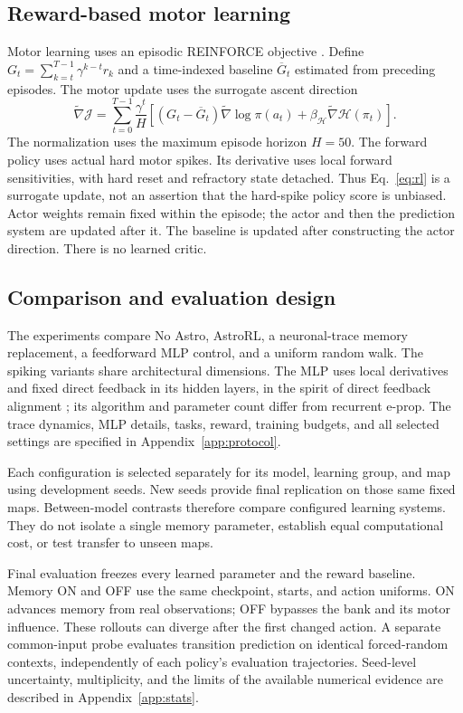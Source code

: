 \subsection{Reward-based motor learning}
Motor learning uses an episodic REINFORCE objective \cite{williams1992}. Define $G_t=\sum_{k=t}^{T-1}\gamma^{k-t}r_k$ and a time-indexed baseline $\overline G_t$ estimated from preceding episodes. The motor update uses the surrogate ascent direction
\begin{equation}
 \widetilde\nabla\mathcal J=
 \sum_{t=0}^{T-1}\frac{\gamma^t}{H}
 \left[(G_t-\overline G_t)\widetilde\nabla\log\pi(a_t)
 +\beta_{\mathcal H}\widetilde\nabla\mathcal H(\pi_t)\right].
 \label{eq:rl}
\end{equation}
The normalization uses the maximum episode horizon $H=50$. The forward policy uses actual hard motor spikes. Its derivative uses local forward sensitivities, with hard reset and refractory state detached. Thus Eq.~\ref{eq:rl} is a surrogate update, not an assertion that the hard-spike policy score is unbiased. Actor weights remain fixed within the episode; the actor and then the prediction system are updated after it. The baseline is updated after constructing the actor direction. There is no learned critic.

\subsection{Comparison and evaluation design}
The experiments compare No Astro, AstroRL, a neuronal-trace memory replacement, a feedforward MLP control, and a uniform random walk. The spiking variants share architectural dimensions. The MLP uses local derivatives and fixed direct feedback in its hidden layers, in the spirit of direct feedback alignment \cite{nokland2016}; its algorithm and parameter count differ from recurrent e-prop. The trace dynamics, MLP details, tasks, reward, training budgets, and all selected settings are specified in Appendix~\ref{app:protocol}.

Each configuration is selected separately for its model, learning group, and map using development seeds. New seeds provide final replication on those same fixed maps. Between-model contrasts therefore compare configured learning systems. They do not isolate a single memory parameter, establish equal computational cost, or test transfer to unseen maps.

Final evaluation freezes every learned parameter and the reward baseline. Memory ON and OFF use the same checkpoint, starts, and action uniforms. ON advances memory from real observations; OFF bypasses the bank and its motor influence. These rollouts can diverge after the first changed action. A separate common-input probe evaluates transition prediction on identical forced-random contexts, independently of each policy's evaluation trajectories. Seed-level uncertainty, multiplicity, and the limits of the available numerical evidence are described in Appendix~\ref{app:stats}.
